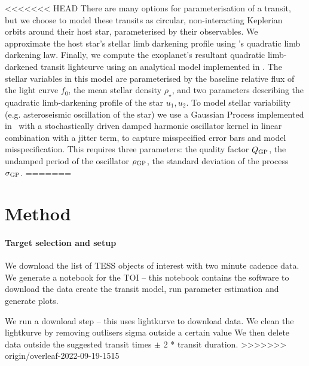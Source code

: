 \documentclass[floatfix,ApJL,twocolumn]{aastex631}
\begin{document}
<<<<<<< HEAD
There are many options for parameterisation of a transit, but we choose to model these transits as circular, non-interacting Keplerian orbits around their host star, parameterised by their observables.
We approximate the host star's stellar limb darkening profile using \citet{Kipping:2013:MNRAS}'s quadratic limb darkening law.
Finally, we compute the exoplanet's resultant quadratic limb-darkened transit lightcurve using an analytical model implemented in \starry.
The stellar variables in this model are parameterised by
the baseline relative flux of the light curve $f_0$,
the mean stellar density $\rho_\star$,
and two parameters describing the quadratic limb-darkening profile of the
star $u_1, u_2$.
To model stellar variability (e.g. asteroseismic oscillation of the star)  we use a Gaussian Process implemented in \celerite\ with a stochastically driven damped harmonic oscillator kernel in linear combination with a jitter term, to capture misspecified error bars and model misspecification. This requires three parameters: the quality factor $Q_{\rm GP}$, the undamped period of the oscillator $\rho_{\rm GP}$, the standard deviation of the process $\sigma_{\rm GP}$.
=======

\section{Method} \label{sec:model}

\paragraph{Target selection and setup }
We download the list of TESS objects of interest with two minute cadence data.
We generate a notebook for the TOI -- this notebook contains the software to download the data create the transit model, run parameter estimation and generate plots.

We run a download step -- this uses lightkurve to download data. 
We clean the lightkurve by removing outlisers sigma outside a certain value
We then delete data outside the suggested transit times $\pm$ 2 * transit duration. 
>>>>>>> origin/overleaf-2022-09-19-1515
\end{document}
